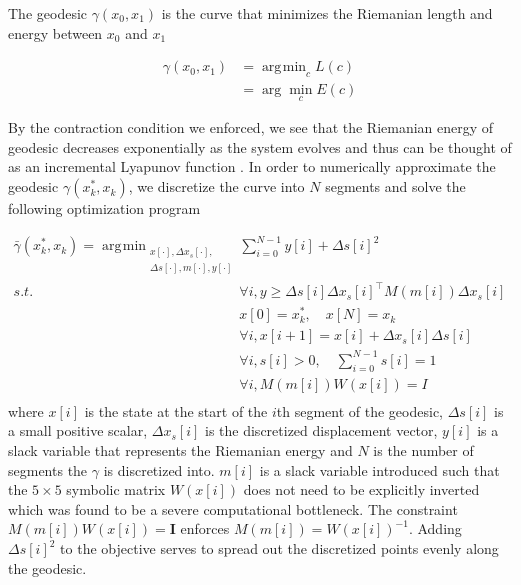 \documentclass[conference]{IEEEtran}
\DeclareMathOperator*{\argmin}{\arg\!\min}
\begin{document}
The geodesic $\gamma(x_0, x_1)$ is the curve that minimizes the Riemanian length and energy between $x_0$ and $x_1$

\begin{equation}
	\label{eq:geodesic}
	\begin{aligned}
		\gamma(x_0, x_1) &= \argmin_{c} L(c) \\
		&= \arg \min_{c} E(c)
	\end{aligned}
\end{equation}

By the contraction condition we enforced, we see that the Riemanian energy of geodesic decreases exponentially as the system evolves and thus can be thought of as an incremental Lyapunov function \autocite{manchesterControlContractionMetrics2017}. In order to numerically approximate the geodesic $\gamma(x^*_k, x_k)$, we discretize the curve into $N$ segments and solve the following optimization program

\begin{equation}
	\label{eq:geodesic_opt}
	\begin{aligned}
		\bar{\gamma}(x^*_k, x_k) = \argmin_{ \substack{ x[\cdot], \Delta x_{s}[\cdot],\\ \Delta s[\cdot], m[\cdot], y[\cdot]}}
		& \sum_{i=0}^{N-1} y[i] + \Delta s[i]^2 \\
		s.t. & \forall i, y \geq \Delta s[i] \Delta x_s[i]^\top M(m[i]) \Delta x_s[i]\\
		& x[0] = x^*_k, \quad x[N] = x_k \\
		& \forall i, x[i+1] = x[i] + \Delta x_{s}[i]\Delta s[i] \\
		& \forall i, s[i] > 0, \quad \sum_{i=0}^{N-1} s[i]	= 1\\
		& \forall i, M(m[i]) W(x[i]) = I  \\
	\end{aligned}
\end{equation}
where $x[i]$ is the state at the start of the $i$th segment of the geodesic, $\Delta s[i]$ is a small positive scalar, $\Delta x_s[i]$ is the discretized displacement vector, $y[i]$ is a slack variable that represents the Riemanian energy and $N$ is the number of segments the $\gamma$ is discretized into. $m[i]$ is a slack variable introduced such that the $5\times5$ symbolic matrix $W(x[i])$ does not need to be explicitly inverted which was found to be a severe computational bottleneck. The constraint $M(m[i]) W(x[i]) = \mathbf{I}$ enforces $M(m[i])=W(x[i])^{-1}$. Adding $\Delta s[i]^2$ to the objective serves to spread out the discretized points evenly along the geodesic.
\end{document}
